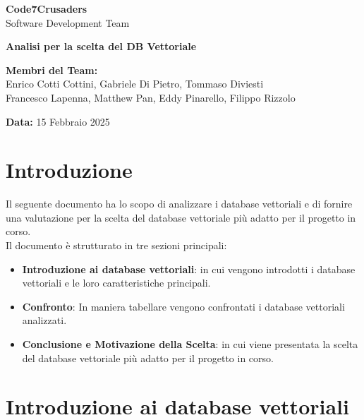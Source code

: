 \documentclass{article}
\begin{document}
\begin{titlepage}
    {\Huge \textbf{Code7Crusaders}}\\
    \vspace{0.5cm}
    {\Large Software Development Team}\\
    \vspace{2cm}
    
    {\large \textbf{Analisi per la scelta del DB Vettoriale}}\\
    \vspace{5cm}

    \textbf{Membri del Team:}\\
    Enrico Cotti Cottini, Gabriele Di Pietro, Tommaso Diviesti \\
    Francesco Lapenna, Matthew Pan, Eddy Pinarello, Filippo Rizzolo \\
    \vspace{0.5cm}
    
    {\large \textbf{Data:}} 15 Febbraio 2025\\
    
    \vspace{1cm}
\end{titlepage}
\clearpage

\newpage
\tableofcontents
\newpage


\section{Introduzione}
Il seguente documento ha lo scopo di analizzare i database vettoriali e di fornire una valutazione per la scelta del database vettoriale più adatto per il progetto in corso.\\
Il documento è strutturato in tre sezioni principali:

\begin{itemize}
    \item \textbf{Introduzione ai database vettoriali}: in cui vengono introdotti i database vettoriali e le loro caratteristiche principali.
    \item \textbf{Confronto}: In maniera tabellare vengono confrontati i database vettoriali analizzati.
    \item \textbf{Conclusione e Motivazione della Scelta}: in cui viene presentata la scelta del database vettoriale più adatto per il progetto in corso.
\end{itemize}

\section{Introduzione ai database vettoriali}
\end{document}
